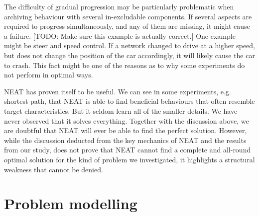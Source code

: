 The difficulty of gradual progression may be particularly problematic when archiving behaviour with several in-excludable components. If several aspects are required to progress simultaneously, and any of them are missing, it might cause a failure. [TODO: Make sure this example is actually correct.] One example might be steer and speed control. If a network changed to drive at a higher speed, but does not change the position of the car accordingly, it will likely cause the car to crash. This fact might be one of the reasons as to why some experiments do not perform in optimal ways.



NEAT has proven itself to be useful. We can see in some experiments, e.g. shortest path, that NEAT is able to find beneficial behaviours that often resemble target characteristics. But it seldom learn all of the smaller details. We have never observed that it solves everything. Together with the discussion above, we are doubtful that NEAT will ever be able to find the perfect solution. However, while the discussion deducted from the key mechanics of NEAT and the results from our study, does not prove that NEAT cannot find a complete and all-round optimal solution for the kind of problem we investigated, it highlights a structural weakness that cannot be denied.





\section{Problem modelling}


